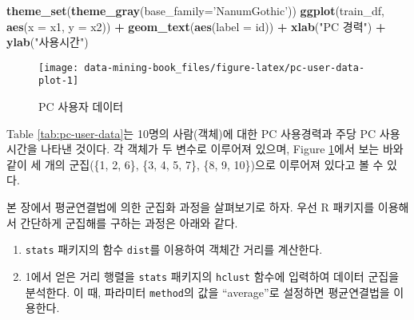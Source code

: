 \documentclass[]{book}
\newenvironment{Shaded}{\begin{snugshade}}{\end{snugshade}}
\newcommand{\DataTypeTok}[1]{\textcolor[rgb]{0.13,0.29,0.53}{#1}}
\newcommand{\DecValTok}[1]{\textcolor[rgb]{0.00,0.00,0.81}{#1}}
\newcommand{\KeywordTok}[1]{\textcolor[rgb]{0.13,0.29,0.53}{\textbf{#1}}}
\newcommand{\NormalTok}[1]{#1}
\newcommand{\OperatorTok}[1]{\textcolor[rgb]{0.81,0.36,0.00}{\textbf{#1}}}
\newcommand{\OtherTok}[1]{\textcolor[rgb]{0.56,0.35,0.01}{#1}}
\newcommand{\StringTok}[1]{\textcolor[rgb]{0.31,0.60,0.02}{#1}}
\providecommand{\tightlist}{%
  \setlength{\itemsep}{0pt}\setlength{\parskip}{0pt}}
\begin{document}
\begin{Shaded}
\begin{Highlighting}[]
\KeywordTok{theme_set}\NormalTok{(}\KeywordTok{theme_gray}\NormalTok{(}\DataTypeTok{base_family=}\StringTok{'NanumGothic'}\NormalTok{))}
\KeywordTok{ggplot}\NormalTok{(train_df, }\KeywordTok{aes}\NormalTok{(}\DataTypeTok{x =}\NormalTok{ x1, }\DataTypeTok{y =}\NormalTok{ x2)) }\OperatorTok{+}
\StringTok{  }\KeywordTok{geom_text}\NormalTok{(}\KeywordTok{aes}\NormalTok{(}\DataTypeTok{label =}\NormalTok{ id)) }\OperatorTok{+}
\StringTok{  }\KeywordTok{xlab}\NormalTok{(}\StringTok{"PC 경력"}\NormalTok{) }\OperatorTok{+}
\StringTok{  }\KeywordTok{ylab}\NormalTok{(}\StringTok{"사용시간"}\NormalTok{)}
\end{Highlighting}
\end{Shaded}

\begin{figure}

{\centering \texttt{[image: data-mining-book\_files/figure-latex/pc-user-data-plot-1]} 

}

\caption{PC 사용자 데이터}\label{fig:pc-user-data-plot}
\end{figure}

Table \ref{tab:pc-user-data}는 10명의 사람(객체)에 대한 PC 사용경력과 주당 PC 사용시간을 나타낸 것이다. 각 객체가 두 변수로 이루어져 있으며, Figure \ref{fig:pc-user-data-plot}에서 보는 바와 같이 세 개의 군집(\{1, 2, 6\}, \{3, 4, 5, 7\}, \{8, 9, 10\})으로 이루어져 있다고 볼 수 있다.

본 장에서 평균연결법에 의한 군집화 과정을 살펴보기로 하자. 우선 R 패키지를 이용해서 간단하게 군집해를 구하는 과정은 아래와 같다.

\begin{enumerate}
\def\labelenumi{\arabic{enumi}.}
\tightlist
\item
  \texttt{stats} 패키지의 함수 \texttt{dist}를 이용하여 객체간 거리를 계산한다.
\item
  1에서 얻은 거리 행렬을 \texttt{stats} 패키지의 \texttt{hclust} 함수에 입력하여 데이터 군집을 분석한다. 이 때, 파라미터 \texttt{method}의 값을 ``average''로 설정하면 평균연결법을 이용한다.
\end{enumerate}

\begin{Shaded}
\end{Shaded}
\end{document}
